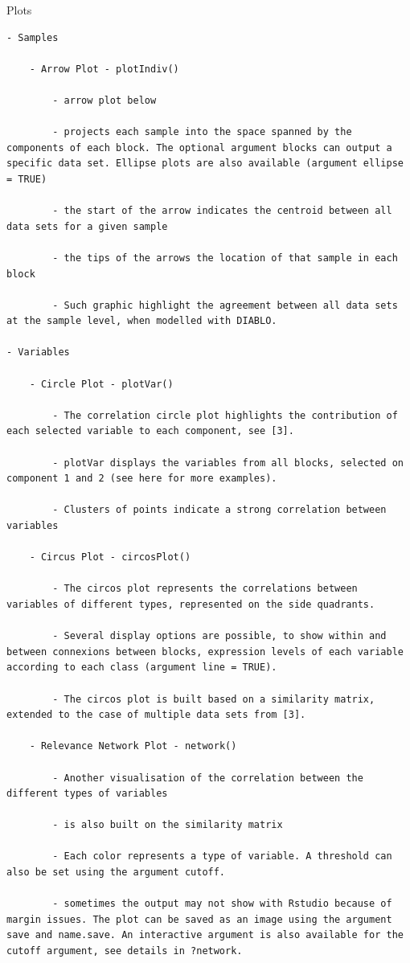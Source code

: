 \documentclass[
]{book}
\begin{document}
Plots

\begin{verbatim}
- Samples

    - Arrow Plot - plotIndiv()

        - arrow plot below

        - projects each sample into the space spanned by the components of each block. The optional argument blocks can output a specific data set. Ellipse plots are also available (argument ellipse = TRUE)

        - the start of the arrow indicates the centroid between all data sets for a given sample

        - the tips of the arrows the location of that sample in each block

        - Such graphic highlight the agreement between all data sets at the sample level, when modelled with DIABLO.

- Variables

    - Circle Plot - plotVar()

        - The correlation circle plot highlights the contribution of each selected variable to each component, see [3].

        - plotVar displays the variables from all blocks, selected on component 1 and 2 (see here for more examples).

        - Clusters of points indicate a strong correlation between variables

    - Circus Plot - circosPlot()

        - The circos plot represents the correlations between variables of different types, represented on the side quadrants.

        - Several display options are possible, to show within and between connexions between blocks, expression levels of each variable according to each class (argument line = TRUE).

        - The circos plot is built based on a similarity matrix, extended to the case of multiple data sets from [3].

    - Relevance Network Plot - network()

        - Another visualisation of the correlation between the different types of variables

        - is also built on the similarity matrix

        - Each color represents a type of variable. A threshold can also be set using the argument cutoff.

        - sometimes the output may not show with Rstudio because of margin issues. The plot can be saved as an image using the argument save and name.save. An interactive argument is also available for the cutoff argument, see details in ?network.


\end{verbatim}
\end{document}
